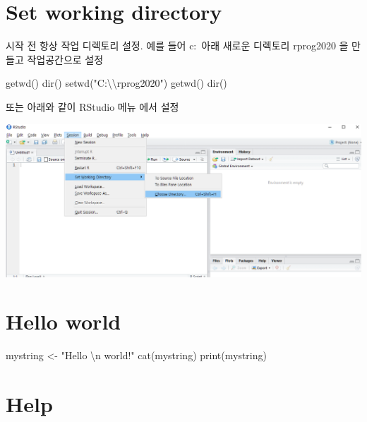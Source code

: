 \documentclass[
]{book}
\newenvironment{Shaded}{\begin{snugshade}}{\end{snugshade}}
\newcommand{\FunctionTok}[1]{\textcolor[rgb]{0.00,0.00,0.00}{#1}}
\newcommand{\NormalTok}[1]{#1}
\newcommand{\OtherTok}[1]{\textcolor[rgb]{0.56,0.35,0.01}{#1}}
\newcommand{\SpecialCharTok}[1]{\textcolor[rgb]{0.00,0.00,0.00}{#1}}
\newcommand{\StringTok}[1]{\textcolor[rgb]{0.31,0.60,0.02}{#1}}
\begin{document}
\hypertarget{set-working-directory}{%
\section{Set working directory}\label{set-working-directory}}

시작 전 항상 작업 디렉토리 설정. 예를 들어 c:~아래 새로운 디렉토리 rprog2020 을 만들고 작업공간으로 설정

\begin{Shaded}
\begin{Highlighting}[]
\FunctionTok{getwd}\NormalTok{()}
\FunctionTok{dir}\NormalTok{()}
\FunctionTok{setwd}\NormalTok{(}\StringTok{"C:}\SpecialCharTok{\textbackslash{}\textbackslash{}}\StringTok{rprog2020"}\NormalTok{)}
\FunctionTok{getwd}\NormalTok{()}
\FunctionTok{dir}\NormalTok{()}
\end{Highlighting}
\end{Shaded}

또는 아래와 같이 RStudio 메뉴 에서 설정

\includegraphics{images/01/01-12.PNG}

\hypertarget{hello-world}{%
\section{Hello world}\label{hello-world}}

\begin{Shaded}
\begin{Highlighting}[]
\NormalTok{mystring }\OtherTok{\textless{}{-}} \StringTok{"Hello }\SpecialCharTok{\textbackslash{}n}\StringTok{ world!"}
\FunctionTok{cat}\NormalTok{(mystring)}
\FunctionTok{print}\NormalTok{(mystring)}
\end{Highlighting}
\end{Shaded}

\hypertarget{help}{%
\section{Help}\label{help}}
\end{document}
